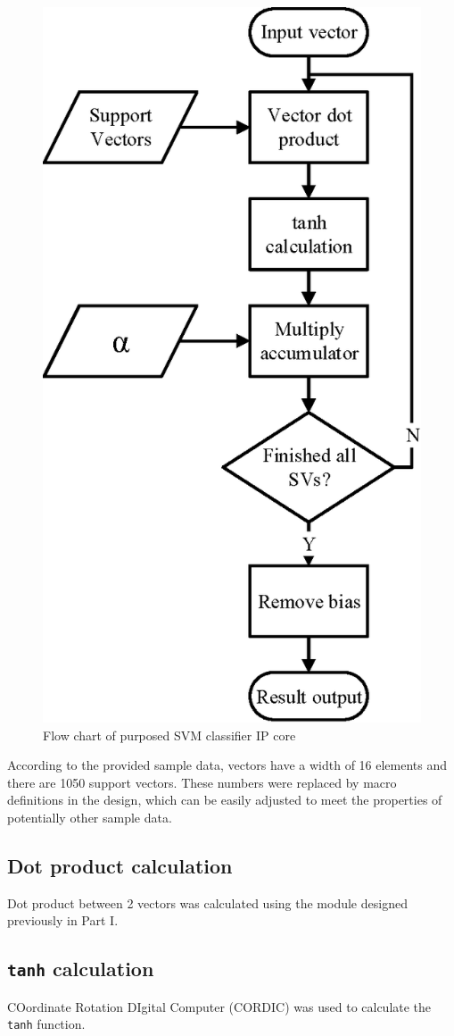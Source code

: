 \documentclass[journal]{IEEEtran}
\begin{document}
\begin{figure}[ht]
	\centering
	\includegraphics[width=0.6\columnwidth]{IP}
	\caption{Flow chart of purposed SVM classifier IP core}
	\label{fig:ip}
\end{figure}

According to the provided sample data, vectors have a width of 16 elements and there are 1050 support vectors. These numbers were replaced by macro definitions in the design, which can be easily adjusted to meet the properties of potentially other sample data.

\subsection{Dot product calculation}

Dot product between 2 vectors was calculated using the module designed previously in Part I.


\subsection{\texttt{tanh} calculation}

COordinate Rotation DIgital Computer (CORDIC) \cite{volder1959cordic} was used to calculate the \texttt{tanh} function.
\end{document}
